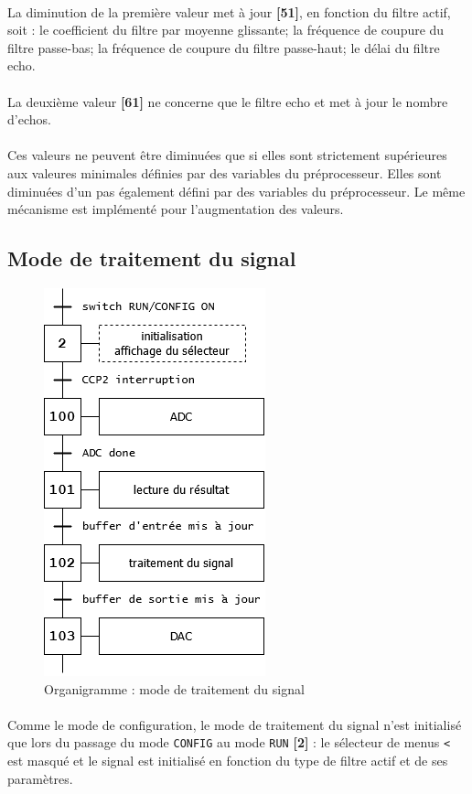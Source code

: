 \documentclass{article}
\begin{document}
    \paragraph{}
    La diminution de la première valeur met à jour \textbf{[51]}, en fonction du filtre actif, soit : le coefficient du filtre par moyenne glissante; la fréquence de coupure du filtre passe-bas; la fréquence de coupure du filtre passe-haut; le délai du filtre echo.

    \paragraph{}
    La deuxième valeur \textbf{[61]} ne concerne que le filtre echo et met à jour le nombre d'echos.

    \paragraph{}
    Ces valeurs ne peuvent être diminuées que si elles sont strictement supérieures aux valeures minimales définies par des variables du préprocesseur. Elles sont diminuées d'un pas également défini par des variables du préprocesseur. Le même mécanisme est implémenté pour l'augmentation des valeurs.

    \subsection{Mode de traitement du signal}
    \begin{figure}[H]
        \centering
        \includegraphics[width=.2\textwidth]{./images/orga_run.png}
        \caption{Organigramme : mode de traitement du signal}
    \end{figure}

    \paragraph{}
    Comme le mode de configuration, le mode de traitement du signal n'est initialisé que lors du passage du mode \texttt{CONFIG} au mode \texttt{RUN} \textbf{[2]} : le sélecteur de menus \texttt{<} est masqué et le signal est initialisé en fonction du type de filtre actif et de ses paramètres.
\end{document}

